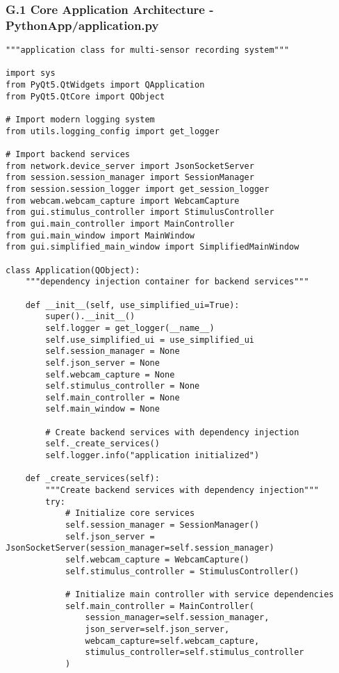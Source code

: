 \documentclass[12pt,a4paper]{article}
\begin{document}
{{\subsubsection{G.1 Core Application Architecture - PythonApp/application.py}

\begin{verbatim}
"""application class for multi-sensor recording system"""

import sys
from PyQt5.QtWidgets import QApplication
from PyQt5.QtCore import QObject

# Import modern logging system
from utils.logging_config import get_logger

# Import backend services
from network.device_server import JsonSocketServer
from session.session_manager import SessionManager
from session.session_logger import get_session_logger
from webcam.webcam_capture import WebcamCapture
from gui.stimulus_controller import StimulusController
from gui.main_controller import MainController
from gui.main_window import MainWindow
from gui.simplified_main_window import SimplifiedMainWindow

class Application(QObject):
    """dependency injection container for backend services"""
    
    def __init__(self, use_simplified_ui=True):
        super().__init__()
        self.logger = get_logger(__name__)
        self.use_simplified_ui = use_simplified_ui
        self.session_manager = None
        self.json_server = None
        self.webcam_capture = None
        self.stimulus_controller = None
        self.main_controller = None
        self.main_window = None
        
        # Create backend services with dependency injection
        self._create_services()
        self.logger.info("application initialized")
    
    def _create_services(self):
        """Create backend services with dependency injection"""
        try:
            # Initialize core services
            self.session_manager = SessionManager()
            self.json_server = JsonSocketServer(session_manager=self.session_manager)
            self.webcam_capture = WebcamCapture()
            self.stimulus_controller = StimulusController()
            
            # Initialize main controller with service dependencies
            self.main_controller = MainController(
                session_manager=self.session_manager,
                json_server=self.json_server,
                webcam_capture=self.webcam_capture,
                stimulus_controller=self.stimulus_controller
            )
            

\end{verbatim}}}
\end{document}
